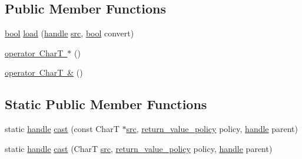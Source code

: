 \subsection*{Public Member Functions}
\begin{DoxyCompactItemize}
\item 
\mbox{\hyperlink{asdl_8h_af6a258d8f3ee5206d682d799316314b1}{bool}} \mbox{\hyperlink{structtype__caster_3_01_char_t_00_01enable__if__t_3_01is__std__char__type_3_01_char_t_01_4_1_1value_01_4_01_4_a156ae9547f1fc1aaa58bd4a8650d88a3}{load}} (\mbox{\hyperlink{classhandle}{handle}} \mbox{\hyperlink{_s_d_l__opengl__glext_8h_a72e0fdf0f845ded60b1fada9e9195cd7}{src}}, \mbox{\hyperlink{asdl_8h_af6a258d8f3ee5206d682d799316314b1}{bool}} convert)
\item 
\mbox{\hyperlink{structtype__caster_3_01_char_t_00_01enable__if__t_3_01is__std__char__type_3_01_char_t_01_4_1_1value_01_4_01_4_a358c337b5e6b6ca3667d43ae8ef30f6e}{operator Char\+T $\ast$}} ()
\item 
\mbox{\hyperlink{structtype__caster_3_01_char_t_00_01enable__if__t_3_01is__std__char__type_3_01_char_t_01_4_1_1value_01_4_01_4_a31577127a3f7ece6ea64950081ae1e68}{operator Char\+T \&}} ()
\end{DoxyCompactItemize}
\subsection*{Static Public Member Functions}
\begin{DoxyCompactItemize}
\item 
static \mbox{\hyperlink{classhandle}{handle}} \mbox{\hyperlink{structtype__caster_3_01_char_t_00_01enable__if__t_3_01is__std__char__type_3_01_char_t_01_4_1_1value_01_4_01_4_a563ebad312024ffe5bc64fa62e62280c}{cast}} (const CharT $\ast$\mbox{\hyperlink{_s_d_l__opengl__glext_8h_a72e0fdf0f845ded60b1fada9e9195cd7}{src}}, \mbox{\hyperlink{detail_2common_8h_adde72ab1fb0dd4b48a5232c349a53841}{return\+\_\+value\+\_\+policy}} policy, \mbox{\hyperlink{classhandle}{handle}} parent)
\item 
static \mbox{\hyperlink{classhandle}{handle}} \mbox{\hyperlink{structtype__caster_3_01_char_t_00_01enable__if__t_3_01is__std__char__type_3_01_char_t_01_4_1_1value_01_4_01_4_a8b90e52758f59f04af295d84b7ab6ba0}{cast}} (CharT \mbox{\hyperlink{_s_d_l__opengl__glext_8h_a72e0fdf0f845ded60b1fada9e9195cd7}{src}}, \mbox{\hyperlink{detail_2common_8h_adde72ab1fb0dd4b48a5232c349a53841}{return\+\_\+value\+\_\+policy}} policy, \mbox{\hyperlink{classhandle}{handle}} parent)
\end{DoxyCompactItemize}
